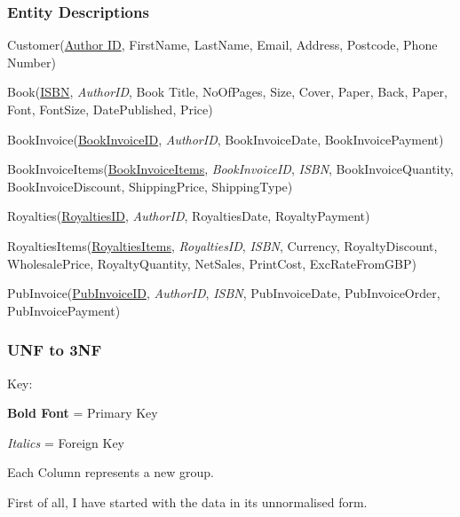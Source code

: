 \subsubsection{Entity Descriptions}

Customer(\underline{Author ID}, FirstName, LastName, Email, Address, Postcode, Phone Number)

Book(\underline{ISBN}, \emph{AuthorID}, Book Title, NoOfPages, Size, Cover, Paper, Back, Paper, Font, FontSize, DatePublished, Price)

BookInvoice(\underline{BookInvoiceID}, \emph{AuthorID}, BookInvoiceDate, BookInvoicePayment)

BookInvoiceItems(\underline{BookInvoiceItems}, \emph{BookInvoiceID}, \emph{ISBN}, BookInvoiceQuantity, BookInvoiceDiscount, ShippingPrice, ShippingType) 

Royalties(\underline{RoyaltiesID}, \emph{AuthorID}, RoyaltiesDate, RoyaltyPayment)

RoyaltiesItems(\underline{RoyaltiesItems}, \emph{RoyaltiesID}, \emph{ISBN}, Currency, RoyaltyDiscount, WholesalePrice, RoyaltyQuantity, NetSales, PrintCost, ExcRateFromGBP)

PubInvoice(\underline{PubInvoiceID}, \emph{AuthorID}, \emph{ISBN}, PubInvoiceDate, PubInvoiceOrder, PubInvoicePayment)


\subsubsection{UNF to 3NF}

Key:

\textbf{Bold Font} = Primary Key

\emph{Italics} = Foreign Key

Each Column represents a new group.

\newpage
First of all, I have started with the data in its unnormalised form.

